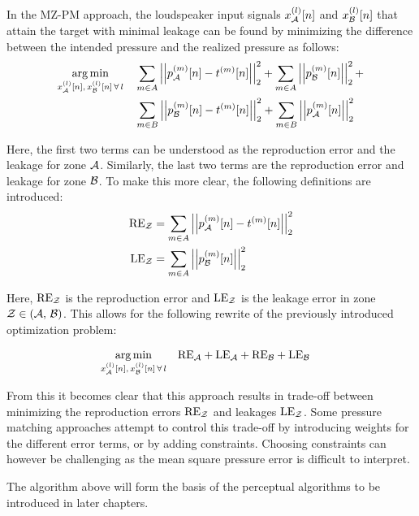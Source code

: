 In the MZ-PM approach, the loudspeaker input signals $x_{\mathcal{A}}^{(l)}[n]$ and $x_{\mathcal{B}}^{(l)}[n]$ that attain the target with minimal leakage can be found by 
minimizing the difference between the intended pressure and the realized pressure as follows:
\begin{align}
    \argmin{x_\za^{(l)}[n],\,x_\zb^{(l)}[n]\,\forall\,l}{
       &\sum_{m\in A} \norm[2][2]{p_\za^{(m)}[n] - t^{(m)}[n]} +
        \sum_{m\in A} \norm[2][2]{p_\zb^{(m)}[n]} + \\
       &\sum_{m\in B} \norm[2][2]{p_\zb^{(m)}[n] - t^{(m)}[n]} + 
        \sum_{m\in B} \norm[2][2]{p_\za^{(m)}[n]}
    }
\end{align}

Here, the first two terms can be understood as the reproduction error and the leakage for zone $\mathcal{A}$.
Similarly, the last two terms are the reproduction error and leakage for zone $\mathcal{B}$. 
To make this more clear, the following definitions are introduced:
\begin{align}
    \text{RE}_\zz &= \sum_{m\in A} \norm[2][2]{p_\za^{(m)}[n] - t^{(m)}[n]} \\
    \text{LE}_\zz &= \sum_{m\in A} \norm[2][2]{p_\zb^{(m)}[n]} 
\end{align}

Here, $\text{RE}_{\mathcal{Z}}$ is the reproduction error and $\text{LE}_{\mathcal{Z}}$ is the leakage error in zone $\mathcal{Z} \in \left(\mathcal{A},\,\mathcal{B}\right)$.
This allows for the following rewrite of the previously introduced optimization problem:

\begin{align}
    \argmin{x_\za^{(l)}[n],\,x_\zb^{(l)}[n]\,\forall\,l}{
       &\text{RE}_\za + \text{LE}_\za + \text{RE}_\zb + \text{LE}_\zb
    }
\end{align}

From this it becomes clear that this approach results in trade-off between minimizing the reproduction errors $\text{RE}_{\mathcal{Z}}$ 
and leakages $\text{LE}_{\mathcal{Z}}$. 
Some pressure matching approaches attempt to control this trade-off by introducing weights for the different error terms, 
or by adding constraints.
Choosing constraints can however be challenging as the mean square pressure error is difficult to interpret.

The algorithm above will form the basis of the perceptual algorithms to be introduced in later chapters.
